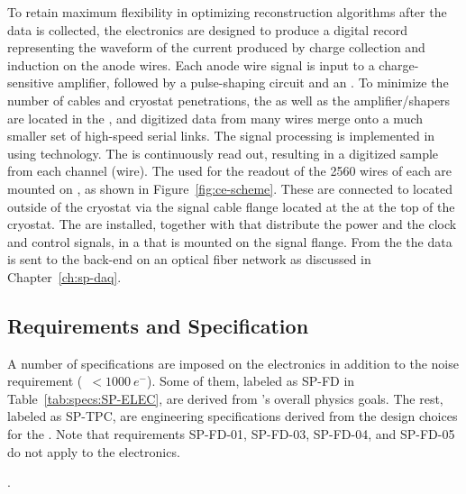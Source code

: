 To retain maximum flexibility in optimizing reconstruction algorithms after 
the  data is collected, the  electronics are designed 
to produce a digital record representing the waveform of the current produced 
by charge collection and induction on the anode wires. Each anode wire signal is 
input to a charge-sensitive amplifier, followed by a pulse-shaping circuit and 
an . To minimize the number of cables and cryostat penetrations, 
the  as well as the amplifier/shapers are located in the , 
and digitized data from many wires merge onto a much smaller set of high-speed 
serial links. The  signal processing is implemented in 
using  technology. The  is continuously read out, resulting 
in a digitized  sample from each  channel (wire). The 
 used for the readout of the \num{2560} wires of each  
are mounted on , as shown in Figure~\ref{fig:ce-scheme}. These are
connected to  located outside of the cryostat via the  signal 
cable flange located at the  \fdth at the top of the cryostat.
The  are installed, together with  that distribute
the power and the clock and control signals, in a  that is
mounted on the signal flange. From the  the data is sent to 
the  back-end on an optical fiber network as discussed in 
Chapter~\ref{ch:sp-daq}. 

\subsection{Requirements and Specification}
\label{sec:fdsp-tpcelec-overview-requirements}

A number of specifications are imposed on the  electronics in addition to the 
noise requirement (~$<\SI{1000}{e^-}$). Some of them, labeled as 
SP-FD in Table~\ref{tab:specs:SP-ELEC}, are derived from 's 
overall physics goals. The rest, labeled as SP-TPC, are engineering specifications 
derived from the design choices for the . Note that requirements 
SP-FD-01, SP-FD-03, SP-FD-04, and SP-FD-05 do not apply to the  electronics. 


.

